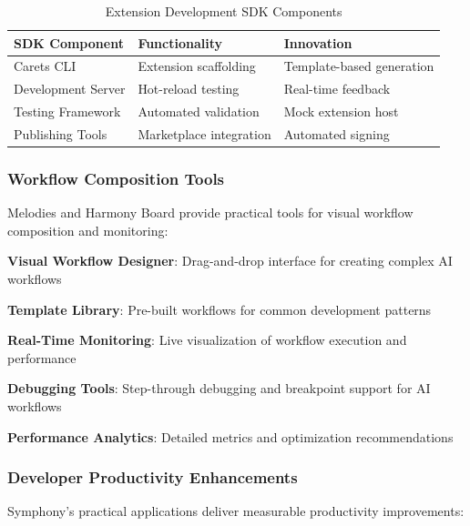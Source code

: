 \begin{successbox}
\begin{alertbox}
\begin{successbox}
\begin{alertbox}
\begin{infobox}[title=Theoretical Framework: AI-First Design Principles]
\begin{successbox}
\begin{alertbox}
\begin{table}[ht]
\centering
\begin{tabular}{@{}lll@{}}
\toprule
\textbf{SDK Component} & \textbf{Functionality} & \textbf{Innovation} \\
\midrule
Carets CLI & Extension scaffolding & Template-based generation \\
Development Server & Hot-reload testing & Real-time feedback \\
Testing Framework & Automated validation & Mock extension host \\
Publishing Tools & Marketplace integration & Automated signing \\
\bottomrule
\end{tabular}
\caption{Extension Development SDK Components}
\label{tab:sdk-components}
\end{table}

\subsubsection{Workflow Composition Tools}

Melodies and Harmony Board provide practical tools for visual workflow composition and monitoring:

\begin{expandedlist}
    \item \textbf{Visual Workflow Designer}: Drag-and-drop interface for creating complex AI workflows
    
    \item \textbf{Template Library}: Pre-built workflows for common development patterns
    
    \item \textbf{Real-Time Monitoring}: Live visualization of workflow execution and performance
    
    \item \textbf{Debugging Tools}: Step-through debugging and breakpoint support for AI workflows
    
    \item \textbf{Performance Analytics}: Detailed metrics and optimization recommendations
\end{expandedlist}

\subsubsection{Developer Productivity Enhancements}

Symphony's practical applications deliver measurable productivity improvements:


\end{alertbox}
\end{successbox}
\end{infobox}
\end{alertbox}
\end{successbox}
\end{alertbox}
\end{successbox}
